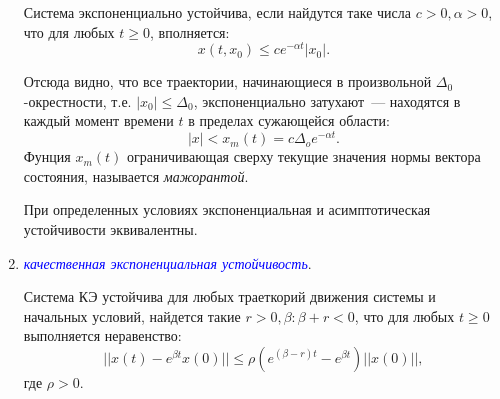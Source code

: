 \begin{enumerate}
    Система экспоненциально устойчива, если найдутся таке числа $c>0, \alpha>0$, что для любых $t \ge 0$, вполняется:
    \begin{equation}
        x(t, x_0) \le c e^{-\alpha t} |x_0|.
    \end{equation}
    
    Отсюда видно, что все траектории, начинающиеся в произвольной $\Delta_0$-окрестности, т.е. $|x_0| \le \Delta_0$, экспоненциально затухают~--- находятся в каждый момент времени $t$ в пределах сужающейся области:
    \begin{equation}
        |x| < x_m(t) = c \Delta_o e^{-\alpha t}.
    \end{equation}
    Фунция $x_m(t)$ ограничивающая сверху текущие значения нормы вектора состояния, называется \textit{мажорантой}.
        
    При определенных условиях экспоненциальная и асимптотическая устойчивости эквивалентны.
            
    \item \textcolor{blue}{\textit{качественная экспоненциальная устойчивость}}.
    
    Система КЭ устойчива для любых траеткорий движения системы и начальных условий, найдется такие $r>0, \beta: \beta + r < 0$, что для любых $t \ge 0$ выполняется неравенство:
    \begin{equation}
        || x(t) - e^{\beta t} x(0) || \le \rho (e^{(\beta - r) t} -e^{\beta t}) ||x(0)||,
    \end{equation}
    где $\rho > 0$.
    
    

\end{enumerate}
